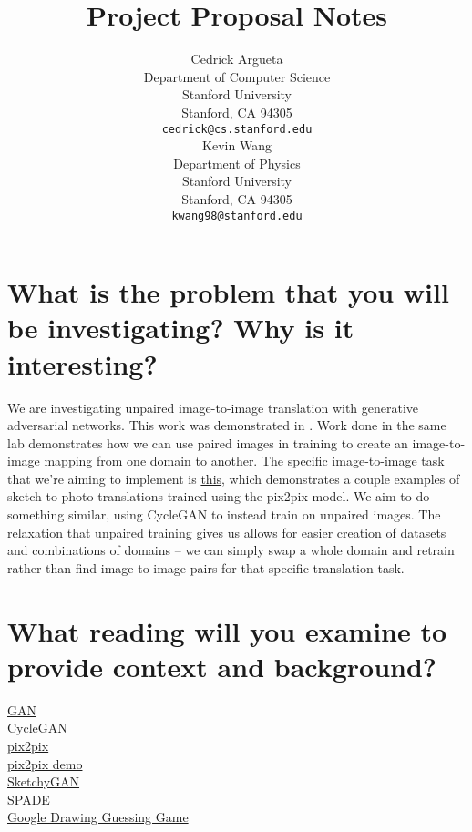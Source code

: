 \documentclass{article}
\title{Project Proposal Notes}
\author{
  Cedrick Argueta \\
  Department of Computer Science\\
  Stanford University\\
  Stanford, CA 94305 \\
  \texttt{cedrick@cs.stanford.edu} \\
  \And
  Kevin Wang \\
  Department of Physics\\
  Stanford University\\
  Stanford, CA 94305 \\
  \texttt{kwang98@stanford.edu} \\
}
\begin{document}

\maketitle

\begin{abstract}

 
\end{abstract}


\section{What is the problem that you will be investigating? Why is it interesting?}

We are investigating unpaired image-to-image translation with generative adversarial networks.
This work was demonstrated in \cite{cycleGAN}.
Work done in the same lab \cite{pix2pix} demonstrates how we can use paired images in training to create an image-to-image mapping from one domain to another.
The specific image-to-image task that we're aiming to implement is \href{https://affinelayer.com/pixsrv/}{this}, which demonstrates a couple examples of sketch-to-photo translations trained using the pix2pix model.
We aim to do something similar, using CycleGAN to instead train on unpaired images.
The relaxation that unpaired training gives us allows for easier creation of datasets and combinations of domains -- we can simply swap a whole domain and retrain rather than find image-to-image pairs for that specific translation task.

\section{What reading will you examine to provide context and background?}

\href{https://arxiv.org/abs/1406.2661}{GAN} \\
\href{https://arxiv.org/pdf/1703.10593.pdf}{CycleGAN} \\
\href{https://arxiv.org/abs/1611.07004}{pix2pix} \\
\href{https://affinelayer.com/pixsrv/}{pix2pix demo} \\
\href{https://arxiv.org/abs/1801.02753}{SketchyGAN} \\
\href{https://arxiv.org/abs/1903.07291}{SPADE} \\
\href{https://quickdraw.withgoogle.com/}{Google Drawing Guessing Game} \\
\end{document}
